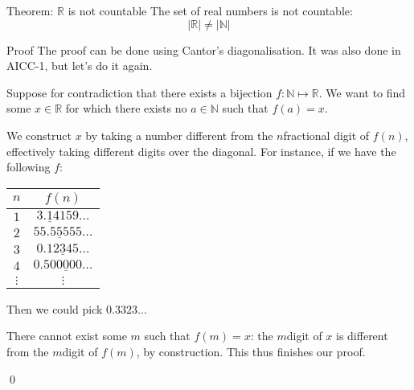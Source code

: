 \documentclass[a4paper]{article}
\begin{document}
\begin{parag}{Theorem: $\mathbb{R}$ is not countable}
    The set of real numbers is not countable:
    \[\left|\mathbb{R}\right| \neq \left|\mathbb{N}\right|\]
    
    \begin{subparag}{Proof}
        The proof can be done using Cantor's diagonalisation. It was also done in AICC-1, but let's do it again.

        Suppose for contradiction that there exists a bijection $f: \mathbb{N} \mapsto \mathbb{R}$. We want to find some $x \in \mathbb{R}$ for which there exists no $a \in \mathbb{N}$ such that $f\left(a\right) = x$.

        We construct $x$ by taking a number different from the $n$\Th fractional digit of $f\left(n\right)$, effectively taking different digits over the diagonal. For instance, if we have the following $f$:
        \begin{center}
        \begin{tabular}{c|c}
            $n$ & $f\left(n\right)$ \\
            \hline
            $1$ & $3.\underline{1}4159\ldots$ \\
            $2$ & $55.5\underline{5}555\ldots$ \\
            $3$ & $0.12\underline{3}45\ldots$ \\
            $4$ & $0.500\underline{0}00\ldots$ \\
            $\vdots$ & $\vdots$
        \end{tabular}
        \end{center}
        
        Then we could pick $0.3323\ldots$

        There cannot exist some $m$ such that $f\left(m\right) = x$: the $m$\Th digit of $x$ is different from the $m$\Th digit of $f\left(m\right)$, by construction. This thus finishes our proof.

        \qed
    \end{subparag}
\end{parag}
\end{document}
